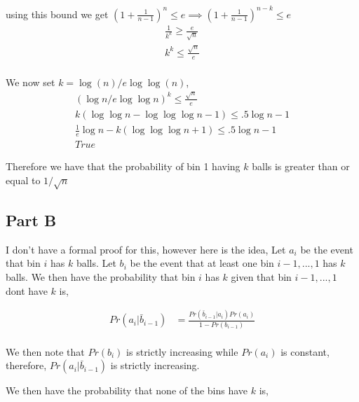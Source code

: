 \documentclass[a4paper]{article}
\begin{document}
using this bound we get $(1 + \frac{1}{n-1})^{n} \leq e \implies (1 + \frac{1}{n-1})^{n-k} \leq e$
\begin{align*}
	\frac{1}{k^k} \geq \frac{e}{\sqrt n}\\
	k^k \leq \frac{\sqrt n}{e}\\
\end{align*}

We now set $k = \log(n) / e\log\log(n)$,
\begin{align*}
	(\log n / e\log\log n)^k \leq \frac{\sqrt n}{e}\\
	k(\log\log n  - \log\log\log n - 1) \leq .5 \log n - 1\\
	\frac{1}{e}\log n - k(\log\log\log n + 1) \leq .5 \log n - 1\\
	True
\end{align*}

Therefore we have that the probability of bin 1 having $k$ balls is greater than or equal to $1/\sqrt{n}$


\subsection{Part B}


I don't have a formal proof for this, however here is the idea,
Let $a_i$ be the event that bin $i$ has $k$ balls.
Let $b_i$ be the event that at least one bin $i-1,...,1$ has $k$ balls.
We then have the probability that bin $i$ has $k$ given that bin $i-1,...,1$ dont have $k$ is, 

\begin{align*}
	Pr(a_i | \bar b_{i-1}) &= \frac{Pr(\bar b_{i-1} | a_i)Pr(a_i)}{1 - Pr (b_{i-1})}\\
\end{align*}

We then note that $Pr(b_i)$ is strictly increasing while $Pr(a_i)$ is constant, 
therefore, $Pr(a_i | \bar b_{i-1})$ is strictly increasing.

We then have the probability that none of the bins have $k$ is,
\end{document}
